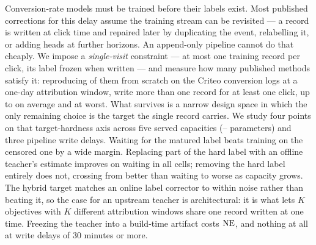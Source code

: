 Conversion-rate models must be trained before their labels exist. Most published corrections for
this delay assume the training stream can be revisited --- a record is written at click time and
repaired later by duplicating the event, relabelling it, or adding heads at further horizons. An
append-only pipeline cannot do that cheaply. We impose a \emph{single-visit} constraint --- at
most one training record per click, its label frozen when written --- and measure how many
published methods satisfy it: reproducing \nScreened{} of them from scratch on the Criteo
conversion logs at a one-day attribution window, \nFail{} write more than one record for at
least one click, up to \maxDup{} on average and \maxVisits{} at worst. What survives is a narrow
design space in which the only remaining choice is the target the single record carries. We
study four points on that target-hardness axis across five served capacities
(\capMin{}--\capMax{} parameters) and three pipeline write delays. Waiting for the matured label
beats training on the censored one by a wide margin. Replacing part of the hard label with an
offline teacher's estimate improves on waiting in all \cdWaitN{} cells; removing the hard label
entirely does not, crossing from better than waiting to worse as capacity grows. The hybrid
target matches an online label corrector to within noise rather
than beating it, so the case for an upstream teacher is architectural: it is what lets $K$
objectives with $K$ different attribution windows share one record written at one time.
Freezing the teacher into a build-time artifact costs \frzMean{} $\mathrm{NE}$, and nothing at all at
write delays of 30 minutes or more.
